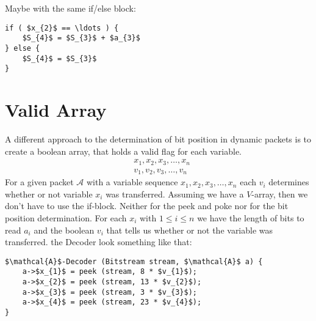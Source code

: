 \documentclass[parskip=half,paper=a4,DIV=12]{scrartcl}
\begin{document}
Maybe with the same if/else block:

\begin{lstlisting}[mathescape]
if ( $x_{2}$ == \ldots ) {
	$S_{4}$ = $S_{3}$ + $a_{3}$
} else {
	$S_{4}$ = $S_{3}$
}
\end{lstlisting}

\section{Valid Array}

A different approach to the determination of bit position in dynamic packets is to create a boolean array, that holds a valid flag for each variable.
\begin{align*}
	&x_{1}, x_{2}, x_{3}, \ldots , x_{n}\\
	&v_{1}, v_{2}, v_{3}, \ldots , v_{n}	
\end{align*}
For a given packet $\mathcal{A}$ with a variable sequence $x_{1}, x_{2}, x_{3}, \ldots , x_{n}$ each $v_{i}$ determines whether or not variable $x_{i}$ was transferred.
Assuming we have a $V$-array, then we don't have to use the if-block.
Neither for the peek and poke nor for the bit position determination.
For each $x_{i}$ with $1\leq i\leq n$ we have the length of bits to read $a_{i}$ and the boolean $v_{i}$ that tells us whether or not the variable was transferred.
the Decoder look something like that:
\begin{lstlisting}[mathescape]
$\mathcal{A}$-Decoder (Bitstream stream, $\mathcal{A}$ a) {
	a->$x_{1}$ = peek (stream, 8 * $v_{1}$);
	a->$x_{2}$ = peek (stream, 13 * $v_{2}$);
	a->$x_{3}$ = peek (stream, 3 * $v_{3}$);
	a->$x_{4}$ = peek (stream, 23 * $v_{4}$);
}
\end{lstlisting}
\end{document}
